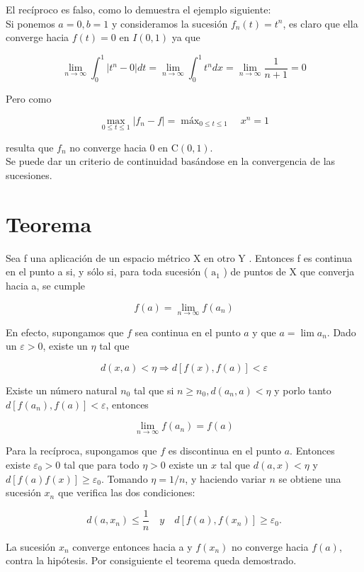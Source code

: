 \documentclass[10pt]{article}
\theoremstyle{plain}
\theoremstyle{definition}
\theoremstyle{remark}
\begin{document}
El recíproco es falso, como lo demuestra el ejemplo siguiente:\\
Si ponemos $a=0, b=1$ y consideramos la sucesión $f_{n}(t)=t^{n}$, es claro que ella converge hacia $f(t)=0$ en $I(0,1)$ ya que

$$
\lim _{n \rightarrow \infty} \int_{0}^{1}\left|t^{n}-0\right| d t=\lim _{n \rightarrow \infty} \int_{0}^{1} t^{n} d x=\lim _{n \rightarrow \infty} \frac{1}{n+1}=0
$$

Pero como

$$
\max _{0 \leqslant t \leqslant 1}\left|f_{n}-f\right|=\operatorname{máx}_{0 \leqslant t \leqslant 1} \quad x^{n}=1
$$

resulta que $f_{n}$ no converge hacia 0 en $\mathrm{C}(0,1)$.\\
Se puede dar un criterio de continuidad basándose en la convergencia de las sucesiones.

\section*{Teorema}
Sea f una aplicación de un espacio métrico X en otro Y . Entonces f es continua en el punto a si, y sólo si, para toda sucesión ( $\mathrm{a}_{1}$ ) de puntos de X que converja hacia a, se cumple

$$
f(a)=\lim _{n \rightarrow \infty} f\left(a_{n}\right)
$$

En efecto, supongamos que $f$ sea continua en el punto $a$ y que $a=\lim a_{n}$. Dado un $\varepsilon>0$, existe un $\eta$ tal que

$$
d(x, a)<\eta \Rightarrow d[f(x), f(a)]<\varepsilon
$$

Existe un número natural $n_{0}$ tal que si $n \geqslant n_{0}, d\left(a_{n}, a\right)<\eta$ y porlo tanto $d\left[f\left(a_{n}\right), f(a)\right]<\varepsilon$, entonces

$$
\lim _{n \rightarrow \infty} f\left(a_{n}\right)=f(a)
$$

Para la recíproca, supongamos que $f$ es discontinua en el punto $a$. Entonces existe $\varepsilon_{0}>0$ tal que para todo $\eta>0$ existe un $x$ tal que $d(a, x)<\eta$ y $d[f(a) f(x)] \geqslant \varepsilon_{0}$. Tomando $\eta=1 / n$, y haciendo variar $n$ se obtiene una sucesión $x_{n}$ que verifica las dos condiciones:

$$
d\left(a, x_{n}\right) \leqslant \frac{1}{n} \quad y \quad d\left[f(a), f\left(x_{n}\right)\right] \geqslant \varepsilon_{0} .
$$

La sucesión $x_{n}$ converge entonces hacia a y $f\left(x_{n}\right)$ no converge hacia $f(a)$, contra la hipótesis. Por consiguiente el teorema queda demostrado.
\end{document}
